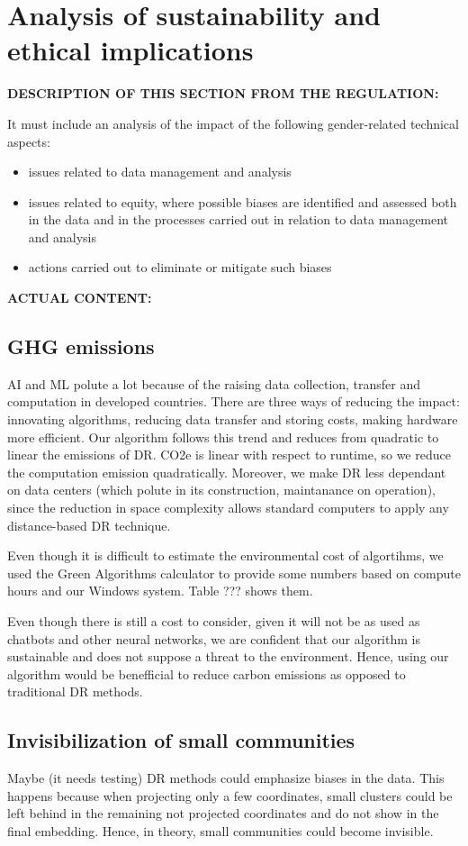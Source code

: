 \section{Analysis of sustainability and ethical implications}

\textbf{DESCRIPTION OF THIS SECTION FROM THE REGULATION:}

It must include an analysis of the impact of the following gender-related technical aspects:

\begin{itemize}
    \item issues related to data management and analysis
    \item issues related to equity, where possible biases are identified and assessed both in the data and in the processes carried out in relation to data management and analysis
    \item actions carried out to eliminate or mitigate such biases
\end{itemize}

\textbf{ACTUAL CONTENT:}

\subsection{GHG emissions}

AI and ML polute a lot because of the raising data collection, transfer and computation in developed countries. There are three ways of reducing the impact: innovating algorithms, reducing data transfer and storing costs, making hardware more efficient. Our algorithm follows this trend and reduces from quadratic to linear the emissions of DR. CO2e is linear with respect to runtime, so we reduce the computation emission quadratically. Moreover, we make DR less dependant on data centers (which polute in its construction, maintanance on operation), since the reduction in space complexity allows standard computers to apply any distance-based DR technique.

Even though it is difficult to estimate the environmental cost of algortihms, we used the Green Algorithms calculator to provide some numbers based on compute hours and our Windows system. Table ??? shows them.

Even though there is still a cost to consider, given it will not be as used as chatbots and other neural networks, we are confident that our algorithm is sustainable and does not suppose a threat to the environment. Hence, using our algorithm would be benefficial to reduce carbon emissions as opposed to traditional DR methods.

\subsection{Invisibilization of small communities}

Maybe (it needs testing) DR methods could emphasize biases in the data. This happens because when projecting only a few coordinates, small clusters could be left behind in the remaining not projected coordinates and do not show in the final embedding. Hence, in theory, small communities could become invisible.